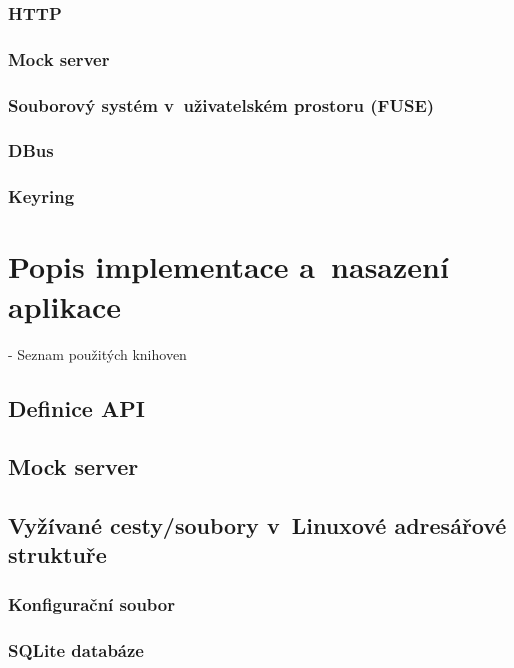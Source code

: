 \subsection{HTTP}

\cite{RFC7231}
\cite{HTTP3}

\subsection{Mock server}

\cite{MockServer}

\subsection{Souborový systém v uživatelském prostoru (FUSE)}

\cite{FuseOrNotToFuse}
\cite{HardeningFUSE}

\subsection{DBus}
\subsection{Keyring}

\cite{Keyring}

\chapter{Popis implementace a nasazení aplikace}

- Seznam použitých knihoven

\section{Definice API}
\section{Mock server}
\section{Vyžívané cesty/soubory v Linuxové adresářové struktuře}
\subsection{Konfigurační soubor}
\subsection{SQLite databáze}
